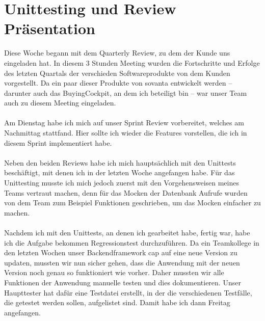 \section{Unittesting und Review Präsentation}
Diese Woche begann mit dem Quarterly Review, zu dem der Kunde uns eingeladen hat. In diesem 3 Stunden Meeting wurden die Fortschritte und Erfolge des letzten Quartals der verschieden Softwareprodukte von dem Kunden vorgestellt. Da ein paar dieser Produkte von sovanta entwickelt werden – darunter auch das BuyingCockpit, an dem ich beteiligt bin – war unser Team auch zu diesem Meeting eingeladen. \\\\
Am Dienstag habe ich mich auf unser Sprint Review vorbereitet, welches am Nachmittag stattfand. Hier sollte ich wieder die Features vorstellen, die ich in diesem Sprint implementiert habe. \\\\
Neben den beiden Reviews habe ich mich hauptsächlich mit den Unittests beschäftigt, mit denen ich in der letzten Woche angefangen habe. Für das Unittesting musste ich mich jedoch zuerst mit den Vorgehensweisen meines Teams vertraut machen, denn für das Mocken der Datenbank Aufrufe wurden von dem Team zum Beispiel Funktionen geschrieben, um das Mocken einfacher zu machen. \\\\
Nachdem ich mit den Unittests, an denen ich gearbeitet habe, fertig war, habe ich die Aufgabe bekommen Regressionstest durchzuführen. Da ein Teamkollege in den letzten Wochen unser Backendframework \acs{cap} auf eine neue Version zu updaten, mussten wir nun sicher gehen, dass die Anwendung mit der neuen Version noch genau so funktioniert wie vorher. Daher mussten wir alle Funktionen der Anwendung manuelle testen und dies dokumentieren. Unser Haupttester hat dafür eine Testdatei erstellt, in der die verschiedenen Testfälle, die getestet werden sollen, aufgelistet sind. Damit habe ich dann Freitag angefangen. \\\\

